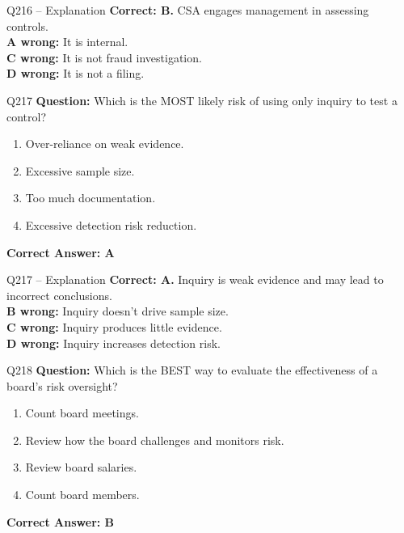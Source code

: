 \documentclass[aspectratio=169,10pt]{beamer}
\begin{document}
	\begin{frame}[t]{Q216 -- Explanation}
		\small
		\textbf{Correct: B.} CSA engages management in assessing controls. \\[4pt]
		\textbf{A wrong:} It is internal. \\[2pt]
		\textbf{C wrong:} It is not fraud investigation. \\[2pt]
		\textbf{D wrong:} It is not a filing.
	\end{frame}
	
	\begin{frame}[t]{Q217}
		\small
		\textbf{Question:} Which is the MOST likely risk of using only inquiry to test a control?
		\begin{enumerate}[label=\Alph*.,itemsep=1pt,topsep=2pt]
			\item Over-reliance on weak evidence.
			\item Excessive sample size.
			\item Too much documentation.
			\item Excessive detection risk reduction.
		\end{enumerate}
		\vspace{4pt}
		\textbf{Correct Answer: A}
	\end{frame}
	
	\begin{frame}[t]{Q217 -- Explanation}
		\small
		\textbf{Correct: A.} Inquiry is weak evidence and may lead to incorrect conclusions. \\[4pt]
		\textbf{B wrong:} Inquiry doesn't drive sample size. \\[2pt]
		\textbf{C wrong:} Inquiry produces little evidence. \\[2pt]
		\textbf{D wrong:} Inquiry increases detection risk.
	\end{frame}
	
	\begin{frame}[t]{Q218}
		\small
		\textbf{Question:} Which is the BEST way to evaluate the effectiveness of a board's risk oversight?
		\begin{enumerate}[label=\Alph*.,itemsep=1pt,topsep=2pt]
			\item Count board meetings.
			\item Review how the board challenges and monitors risk.
			\item Review board salaries.
			\item Count board members.
		\end{enumerate}
		\vspace{4pt}
		\textbf{Correct Answer: B}
	\end{frame}
	
\end{document}
